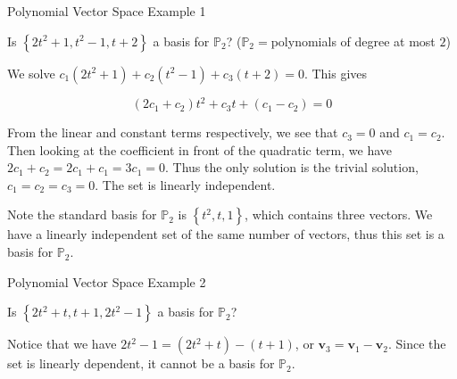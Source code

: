 \documentclass[xcolor=dvipsnames,aspectratio=169,t]{beamer}
\begin{document}
\begin{frame}{Polynomial Vector Space Example 1}
  \medskip

Is \alert{$\left\{ 2t^2+1, t^2-1, t+2 \right\}$} a basis for \alert{$\mathbb{P}_2$}? ($\mathbb{P}_2=$polynomials of degree at most $2$) \vspace{0.25in}

\pause
We solve $c_1 ( 2t^2+1) + c_2 (t^2-1) + c_3(t+2)= 0$. This gives

\[ (2c_1 + c_2)t^2 + c_3t + (c_1-c_2) = 0 \]

From the linear and constant terms respectively, we see that $c_3=0$ and $c_1 = c_2$. Then looking at the coefficient in front of the quadratic term, we have $2c_1 + c_2 = 2c_1 + c_1 = 3c_1 =0$. Thus the only solution is the trivial solution, $c_1=c_2=c_3=0$. The set is linearly independent. \ms

Note the standard basis for $\mathbb{P}_2$ is $\left\{ t^2, t, 1 \right\}$, which contains three vectors. We have a linearly independent set of the same number of vectors, thus this set is a basis for $\mathbb{P}_2$.


\end{frame}

\begin{frame}{Polynomial Vector Space Example 2}
\medskip

Is \alert{$\left\{ 2t^2+t, t+1, 2t^2-1 \right\}$} a basis for \alert{$\mathbb{P}_2$}?  \vspace{0.5in}

\pause
Notice that we have $2t^2-1 = (2t^2+t) - (t+1)$, or $\mathbf{v}_3 = \mathbf{v}_1 - \mathbf{v}_2$. Since the set is linearly dependent, it cannot be a basis for $\mathbb{P}_2$.

\end{frame}
\end{document}
